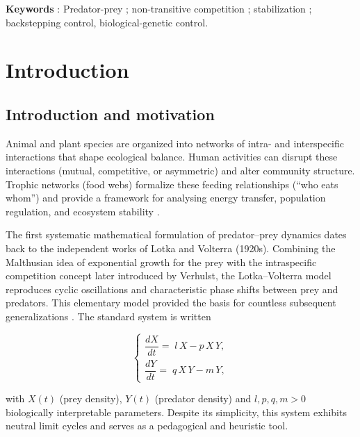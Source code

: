 \documentclass[10pt, a4paper]{amsart}
\newcounter{assu}
\theoremstyle{plain}
\theoremstyle{definition}
\theoremstyle{remark}
\numberwithin{equation}{section}
\begin{document}
{\bf Keywords} : Predator-prey ; non-transitive  competition ; stabilization ;  backstepping control, biological-genetic control.
\section{\bf Introduction}\label{s1}%
\subsection{Introduction and  motivation}\label{s11}

Animal and plant species are organized into networks of intra- and interspecific interactions that shape ecological balance. Human activities can disrupt these interactions (mutual, competitive, or asymmetric) and alter community structure. Trophic networks (food webs) formalize these feeding relationships (“who eats whom”) and provide a framework for analysing energy transfer, population regulation, and ecosystem stability \cite{ref55,ref56,ref30}.

The first systematic mathematical formulation of predator–prey dynamics dates back to the independent works of Lotka and Volterra (1920s). Combining the Malthusian idea of exponential growth for the prey with the intraspecific competition concept later introduced by Verhulst, the Lotka–Volterra model reproduces cyclic oscillations and characteristic phase shifts between prey and predators. This elementary model provided the basis for countless subsequent generalizations \cite{ref3,ref5}. The standard system is written

$$
\begin{cases}
\dfrac{dX}{dt}=\;l\,X-p\,X\,Y,\\[6pt]
\dfrac{dY}{dt}=\;q\,X\,Y-m\,Y,
\end{cases}
$$

with $X(t)$ (prey density), $Y(t)$ (predator density) and $l,p,q,m>0$ biologically interpretable parameters. Despite its simplicity, this system exhibits neutral limit cycles and serves as a pedagogical and heuristic tool.
\end{document}
